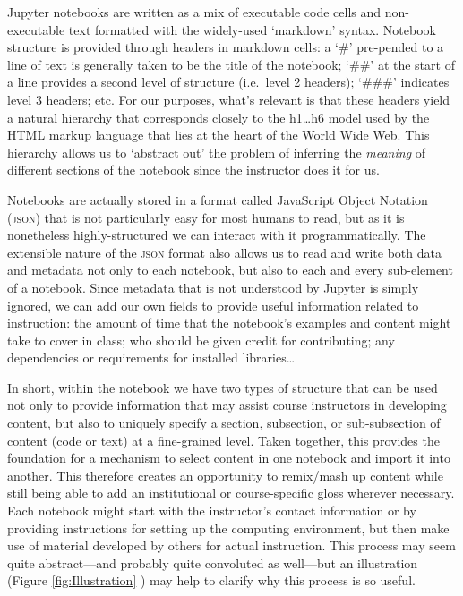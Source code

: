 \documentclass[letter, 11pt]{article}
\newcommand{\ie}{i.e.~\/}
\begin{document}
Jupyter notebooks are written as a mix of executable code cells and
non-executable text formatted with the widely-used `markdown' syntax. Notebook
structure is provided through headers in markdown cells: a `\#' pre-pended to a
line of text is generally taken to be the title of the notebook; `\#\#' at the
start of a line provides a second level of structure (\ie level 2 headers);
`\#\#\#' indicates level 3 headers; etc. For our purposes, what's relevant is
that these headers yield a natural hierarchy that corresponds closely to the
h1\ldots{}h6 model used by the HTML markup language that lies at the heart of
the World Wide Web. This hierarchy allows us to `abstract out' the problem of
inferring the \emph{meaning} of different sections of the notebook since the
instructor does it for us.

Notebooks are actually stored in a format called JavaScript Object Notation
(\textsc{json}) that is not particularly easy for most humans to read, but as it
is nonetheless highly-structured we can interact with it programmatically. The
extensible nature of the \textsc{json} format also allows us to read and write
both data and metadata not only to each notebook, but also to each and every
sub-element of a notebook. Since metadata that is not understood by Jupyter is
simply ignored, we can add our own fields to provide useful information related
to instruction: the amount of time that the notebook's examples and content
might take to cover in class; who should be given credit for contributing; any
dependencies or requirements for installed libraries\ldots

In short, within the notebook we have two types of structure that can be used
not only to provide information that may assist course instructors in developing
content, but also to uniquely specify a section, subsection, or sub-subsection
of content (code or text) at a fine-grained level. Taken together, this provides
the foundation for a mechanism to select content in one notebook and import it
into another. This therefore creates an opportunity to remix/mash up content
while still being able to add an institutional or course-specific gloss wherever
necessary. Each notebook might start with the instructor's contact information
or by providing instructions for setting up the computing environment, but then
make use of material developed by others for actual instruction. This process
may seem quite abstract---and probably quite convoluted as well---but an
illustration (Figure \ref{fig:Illustration} )
may help to clarify why this process is so useful.
\end{document}
